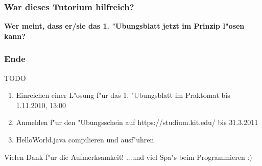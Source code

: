 \documentclass{beamer}
\begin{document}
\begin{frame}
\frametitle{War dieses Tutorium hilfreich?}
\begin{center}
\textbf{\Huge Wer meint, dass er/sie das 1. "Ubungsblatt jetzt im Prinzip l"osen kann?}
\end{center}
\end{frame}


\begin{frame}
\frametitle{Ende}
\begin{block}{TODO}
\begin{enumerate}
\item Einreichen einer L"osung f"ur das 1. "Ubungsblatt im Praktomat bis \alert{1.11.2010, 13:00}
\item Anmelden f"ur den "Ubungsschein auf https://studium.kit.edu/ bis \alert{31.3.2011}
\item HelloWorld.java compilieren und ausf"uhren
\end{enumerate}
\end{block}

\begin{block}{Vielen Dank f"ur die Aufmerksamkeit!}
...und viel Spa"s beim Programmieren :)
\end{block}
\end{frame}
\end{document}
